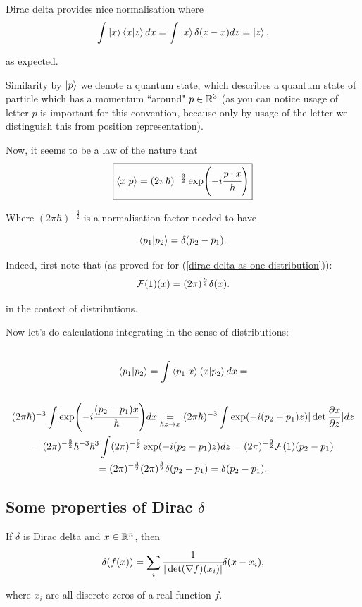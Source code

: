 \documentclass[main.tex]{subfiles}
\begin{document}
Dirac delta provides nice normalisation where
\begin{equation}
\int \ket{x}\bra{x}\ket{z}dx = \int \ket{x}\delta(z - x) dz = \ket{z},  
\end{equation}    

as expected.

Similarity by $\ket{p}$ we denote a quantum state, which describes a quantum state of particle which has a momentum ``around" $p\in \mathbb{R}^3$ (as you can notice usage of letter $p$ is important for this convention, because only by usage of the letter we distinguish this from position representation).

Now, it seems to be a law of the nature that
\begin{equation}
\boxed{
\bra{x}\ket{p} = (2\pi\hbar)^{-\frac{3}{2}} \exp(-i\cfrac{p\cdot x}{\hbar})
}
\end{equation}

Where $(2\pi\hbar)^{-\frac{3}{2}}$ is a normalisation factor needed to have 

\begin{equation}
\bra{p_1}\ket{p_2} = \delta(p_2 - p_1).
\end{equation} 

Indeed, first note that (as proved for for (\ref{dirac-delta-as-one-distribution})):
\begin{equation}
\mathcal{F}(1)(x) = (2\pi)^\frac{n}{2}\delta(x). 
\end{equation}

in the context of distributions.

Now let's do calculations integrating in the sense of distributions:
\begin{multline*}\\
\bra{p_1}\ket{p_2} = \int\bra{p_1} \ket{x}\bra{x} \ket{p_2} dx = \\
\\ (2\pi\hbar)^{-3} \int \exp(-i \cfrac{(p_2 - p_1)x}{\hbar})dx \underset{\hbar z\to x}{=}
(2\pi\hbar)^{-3} \int \exp(-i(p_2 - p_1)z) |\det \frac{\partial x}{\partial z}|dz
\\ = (2\pi)^{-\frac{3}{2}} \hbar^{-3} \hbar^3 \int (2\pi)^{-\frac{3}{2}} \exp(-i(p_2 - p_1)z)dz = (2\pi)^{-\frac{3}{2}} \mathcal{F}(1)(p_2 - p_1)
\\ = (2\pi)^{-\frac{3}{2}} (2\pi)^{\frac{3}{2}} \delta(p_2 - p_1) = \delta(p_2 - p_1).
\\
\end{multline*}

\subsection{Some properties of Dirac $\delta$}
\begin{fact}
\label{delta-zeros}
If $\delta$ is Dirac delta and $x\in \mathbb{R}^n$, then
\begin{equation}
\delta(f(x)) = \sum_i \cfrac{1}{|\det (\nabla f)(x_i)|}\delta(x-x_i),
\end{equation}

where $x_i$ are all discrete zeros of a real function $f$.
\end{fact}
\end{document}

